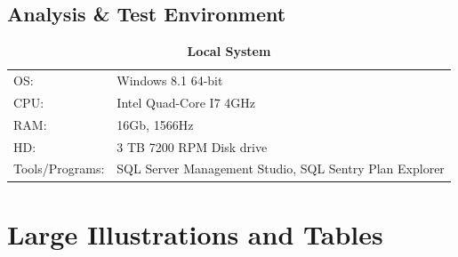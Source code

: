 \documentclass{cslthse-msc}
\begin{document}
\begin{appendices}
\section{Analysis \& Test Environment}\label{Aenviron}
\begin{table}[H]
\begin{center}
\caption*{\textbf{Local System}}
\begin{tabular}{l l}
OS: & Windows 8.1 64-bit\\
CPU: & Intel Quad-Core I7 4GHz\\
RAM: & 16Gb, 1566Hz\\
HD: & 3 TB 7200 RPM Disk drive \\
Tools/Programs: & SQL Server Management Studio, SQL Sentry Plan Explorer\\
\end{tabular}
\end{center}
\end{table}

\chapter{Large Illustrations and Tables}\label{sec:appTabIll}
\begin{table}[H]
\centering
{}
\end{table}
\end{appendices}
\end{document}
